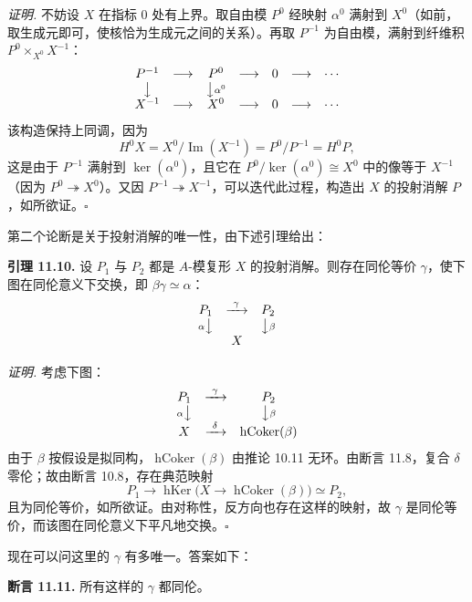 \textit{证明.} 不妨设 $X$ 在指标 $0$ 处有上界。取自由模 $P^0$ 经映射 $\alpha^0$ 满射到 $X^0$（如前，取生成元即可，使核恰为生成元之间的关系）。再取 $P^{-1}$ 为自由模，满射到纤维积 $P^0\times_{X^0}X^{-1}$：
\[
\begin{array}{ccccccc}
P^{-1} & \longrightarrow & P^0 & \longrightarrow & 0 & \longrightarrow & \cdots\\
\big\downarrow & & \big\downarrow{\scriptstyle\alpha^0} & & & & \\
X^{-1} & \longrightarrow & X^0 & \longrightarrow & 0 & \longrightarrow & \cdots
\end{array}
\]
该构造保持上同调，因为
\[
H^0X=X^0/\operatorname{Im}(X^{-1})=P^0/P^{-1}=H^0P,
\]
这是由于 $P^{-1}$ 满射到 $\ker(\alpha^0)$，且它在 $P^0/\ker(\alpha^0)\cong X^0$ 中的像等于 $X^{-1}$（因为 $P^0\twoheadrightarrow X^0$）。又因 $P^{-1}\twoheadrightarrow X^{-1}$，可以迭代此过程，构造出 $X$ 的投射消解 $P$，如所欲证。\hfill$\square$

第二个论断是关于投射消解的唯一性，由下述引理给出：

\textbf{引理 11.10.} 设 $P_1$ 与 $P_2$ 都是 $A$-模复形 $X$ 的投射消解。则存在同伦等价 $\gamma$，使下图在同伦意义下交换，即 $\beta\gamma\simeq\alpha$：
\[
\begin{array}{ccccc}
& P_1 & \xrightarrow{\ \gamma\ } & P_2 & \\
& {\scriptstyle\alpha}\big\downarrow & & \big\downarrow{\scriptstyle\beta} & \\
& & X & &
\end{array}
\]

\textit{证明.} 考虑下图：
\[
\begin{array}{ccccc}
& P_1 & \xrightarrow{\ \gamma\ } & P_2 & \\
& {\scriptstyle\alpha}\big\downarrow & & \big\downarrow{\scriptstyle\beta} & \\
& X & \xrightarrow{\ \delta\ } & \operatorname{hCoker}(\beta) &
\end{array}
\]
由于 $\beta$ 按假设是拟同构，$\operatorname{hCoker}(\beta)$ 由推论 10.11 无环。由断言 11.8，复合 $\delta$ 零伦；故由断言 10.8，存在典范映射
\[
P_1\to\operatorname{hKer}\bigl(X\to\operatorname{hCoker}(\beta)\bigr)\simeq P_2,
\]
且为同伦等价，如所欲证。由对称性，反方向也存在这样的映射，故 $\gamma$ 是同伦等价，而该图在同伦意义下平凡地交换。\hfill$\square$

现在可以问这里的 $\gamma$ 有多唯一。答案如下：

\textbf{断言 11.11.} 所有这样的 $\gamma$ 都同伦。

